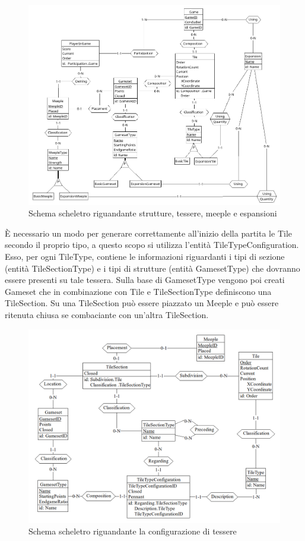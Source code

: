 \begin{figure}[ht]
    \centerline{\includegraphics[scale=0.45]{images/Progettazione/Concettuale/Scheletro2.png}}
    \caption{Schema scheletro riguandante strutture, tessere, meeple e espansioni}
\end{figure}

È necessario un modo per generare correttamente all'inizio della partita le Tile secondo il proprio tipo, a questo scopo si utilizza l'entità TileTypeConfiguration. Esso, per ogni TileType, contiene le informazioni riguardanti i tipi di sezione (entità TileSectionType) e i tipi di strutture (entità GamesetType) che dovranno essere presenti su tale tessera. Sulla base di GamesetType vengono poi creati Gameset che in combinazione con Tile e TileSectionType definiscono una TileSection. Su una TileSection può essere piazzato un Meeple e può essere ritenuta chiusa se combaciante con un'altra TileSection.
\clearpage

\begin{figure}[ht]
    \centering\includegraphics[scale=0.3]{images/Progettazione/Concettuale/Scheletro3.png}
    \caption{Schema scheletro riguandante la configurazione di tessere}
\end{figure}


